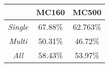 \begin{tabular}{c|c|c|}
\cline{2-3}
\textbf{}                             & \textbf{MC160} & \textbf{MC500} \\ \hline
\multicolumn{1}{|c|}{\textit{Single}} & 67.88\%        & 62.763\%        \\ \hline
\multicolumn{1}{|c|}{\textit{Multi}}  & 50.31\%        & 46.72\%        \\ \hline
\multicolumn{1}{|c|}{\textit{All}}    & 58.43\%        & 53.97\%        \\ \hline
\end{tabular}